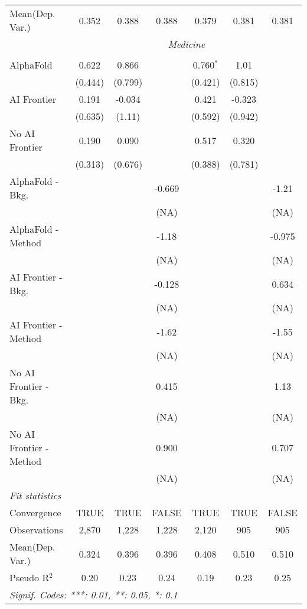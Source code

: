 \begin{tabular}{lcccccc}
Mean(Dep. Var.) & 0.352 & 0.388 & 0.388 & 0.379 & 0.381 & 0.381 \\
 & \multicolumn{6}{c}{\textit{Medicine}} \\ \\
   AlphaFold               & 0.622   & 0.866   &        & 0.760$^{*}$ & 1.01    &   \\   
                           & (0.444) & (0.799) &        & (0.421)     & (0.815) &   \\   
   AI Frontier             & 0.191   & -0.034  &        & 0.421       & -0.323  &   \\   
                           & (0.635) & (1.11)  &        & (0.592)     & (0.942) &   \\   
   No AI Frontier          & 0.190   & 0.090   &        & 0.517       & 0.320   &   \\   
                           & (0.313) & (0.676) &        & (0.388)     & (0.781) &   \\   
   AlphaFold - Bkg.        &         &         & -0.669 &             &         & -1.21\\   
                           &         &         & (NA)   &             &         & (NA)\\   
   AlphaFold - Method      &         &         & -1.18  &             &         & -0.975\\   
                           &         &         & (NA)   &             &         & (NA)\\   
   AI Frontier - Bkg.      &         &         & -0.128 &             &         & 0.634\\   
                           &         &         & (NA)   &             &         & (NA)\\   
   AI Frontier - Method    &         &         & -1.62  &             &         & -1.55\\   
                           &         &         & (NA)   &             &         & (NA)\\   
   No AI Frontier - Bkg.   &         &         & 0.415  &             &         & 1.13\\   
                           &         &         & (NA)   &             &         & (NA)\\   
   No AI Frontier - Method &         &         & 0.900  &             &         & 0.707\\   
                           &         &         & (NA)   &             &         & (NA)\\   
   \midrule
   \emph{Fit statistics}\\
   Convergence             &TRUE     & TRUE    & FALSE  & TRUE        & TRUE    & FALSE\\  
   Observations            & 2,870   & 1,228   & 1,228  & 2,120       & 905     & 905\\  
Mean(Dep. Var.) & 0.324 & 0.396 & 0.396 & 0.408 & 0.510 & 0.510 \\
   Pseudo R$^2$            & 0.20    & 0.23    & 0.24   & 0.19        & 0.23    & 0.25\\  
   \midrule \midrule
   \multicolumn{7}{l}{\emph{Signif. Codes: ***: 0.01, **: 0.05, *: 0.1}}\\
\end{tabular}
\par\endgroup
